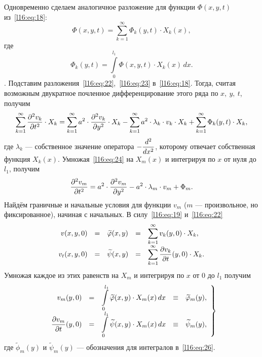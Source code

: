 Одновременно сделаем аналогичное разложение для функции $\Phi(x,y,t)$ из~\eqref{l16:eq:18}:
\begin{equation}\label{l16:eq:23}
	\Phi(x,y,t)=\sum\limits_{k=1}^{\infty}\Phi_k(y,t)\cdot X_k(x),
\end{equation}
где 
\begin{equation*}
	\Phi_k(y,t)=\int\limits_0^{l_1}\Phi(x,y,t)\cdot X_k(x)\,dx.
\end{equation*}.
Подставим разложения~\eqref{l16:eq:22},~\eqref{l16:eq:23} в~\eqref{l16:eq:18}. Тогда, считая возможным двукратное почленное дифференцирование этого ряда по $x,\ y,\ t$, получим 
\begin{equation}\label{l16:eq:24}
	\sum\limits_{k=1}^{\infty}\frac{\partial^2v_k}{\partial t^2}\cdot X_k=\sum\limits_{k=1}^{\infty}a^2\cdot\frac{\partial^2v_k}{\partial y^2}\cdot X_k-\sum\limits_{k=1}^{\infty}a^2\cdot\lambda_k\cdot v_k\cdot X_k+\sum\limits_{k=1}^{\infty}\Phi_k(y,t)\cdot X_k,
\end{equation}
где $\lambda_k$ --- собственное значение оператора $-\displaystyle\frac{d^2}{dx^2}$, которому отвечает собственная функция $X_k(x)$. Умножая~\eqref{l16:eq:24} на $X_m(x)$ и интегрируя по $x$ от нуля до $l_1$, получим
\begin{equation}\label{l16:eq:25}
	\frac{\partial^2v_m}{\partial t^2}=a^2\cdot\frac{\partial^2v_m}{\partial y^2}-a^2\cdot\lambda_m\cdot v_m+\Phi_m.
\end{equation} 
Найдём граничные и начальные условия для функции $v_m$ ($m$ --- произвольное, но фиксированное), начиная с начальных. В силу~\eqref{l16:eq:19} и~\eqref{l16:eq:22} 
\begin{equation*}
	\begin{array}{rcccl}
		v(x,y,0)&=&\widetilde{\varphi}(x,y)&=&\displaystyle\sum\limits_{k=1}^{\infty}v_k(y,0)\cdot X_k,\\
		v_t(x,y,0)&=&\widetilde{\psi}(x,y)&=&\displaystyle\sum\limits_{k=1}^{\infty}\frac{\partial v_k}{\partial t}(y,0)\cdot X_k.
	\end{array}
\end{equation*}
Умножая каждое из этих равенств на $X_m$ и интегрируя по $x$ от $0$ до $l_1$ получим 
\begin{equation}\label{l16:eq:26}
	\left.\begin{array}{rcccl}
		v_m(y,0)&=&\displaystyle\int\limits_0^{l_1}\widetilde{\varphi}(x,y)\cdot X_m(x)\,dx& \equiv& \widetilde{\varphi}_m(y),\\
		\displaystyle\frac{\partial v_m}{\partial t}(y,0)&=&\displaystyle\int\limits_0^{l_1}\widetilde{\psi}(x,y)\cdot X_m(x)\,dx&\equiv&\widetilde{\psi}_m(y),
	\end{array}\right\}
\end{equation}
где $\widetilde{\phi}_m(y)$ и $\widetilde{\psi}_m(y)$ --- обозначения для интегралов в~\eqref{l16:eq:26}.

